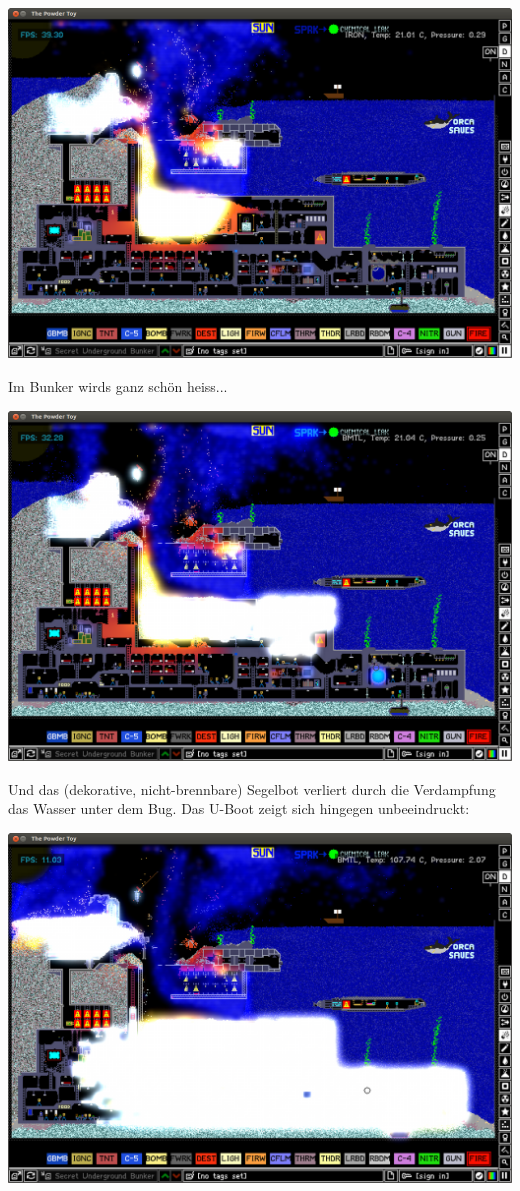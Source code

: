 \documentclass[10pt,a4paper,ngerman,twoside]{article} %
\begin{document}
\begin{multicols}{2}
\begin{center}
\includegraphics[width=\linewidth]{powdertoy/powdertoy-bu7.png}
\end{center}
Im Bunker wirds ganz schön heiss...
\begin{center}
\includegraphics[width=\linewidth]{powdertoy/powdertoy-bu8.png}
\end{center}
Und das (dekorative, nicht-brennbare) Segelbot verliert durch die Verdampfung das Wasser unter dem Bug. Das U-Boot zeigt sich hingegen unbeeindruckt:
\begin{center}
\includegraphics[width=\linewidth]{powdertoy/powdertoy-bu9.png}

\end{center}
\end{multicols}
\end{document}
